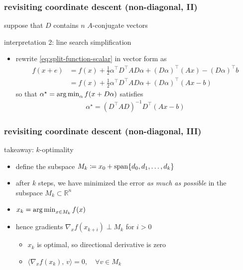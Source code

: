 \documentclass[10pt,dvipsnames*]{beamer}
\begin{document}
%
\begin{frame}
  \frametitle{revisiting coordinate descent (non-diagonal, II)}
  \pause
  \begin{assumption*}
    suppose that $D$ contains $n$ $A$-conjugate vectors
  \end{assumption*}
  \pause
  \begin{alertblock}{interpretation 2: line search simplification}
    \begin{itemize}
      \item rewrite \cref{eq:split-function-scalar} in vector form as
      \begin{align}
        \label{eq:split-function-vector}
        f(x + e) &= f(x) + \tfrac 12 \alpha^{\top} D^{\top} A D \alpha + (D\alpha)^{\top} (Ax) - (D\alpha)^{\top} b \\
        &= f(x) + \tfrac 12 \alpha^{\top} D^{\top} A D \alpha + (D\alpha)^{\top} (Ax - b)
      \end{align}
      so that $\alpha^{\star} = \operatorname*{arg\,min}_{\alpha} f(x + D\alpha)$ satisfies
      \begin{align}
        \label{eq:split-minimization-vector}
        \alpha^{\star} = (D^{\top} A D)^{-1} D^{\top} (Ax-b)
      \end{align}
    \end{itemize}
  \end{alertblock}
\end{frame}
%
\begin{frame}
  \frametitle{revisiting coordinate descent (non-diagonal, III)}
  \begin{block}{takeaway: $k$-optimality}
    \begin{itemize}
      \item define the subspace $M_k \coloneqq x_0 + \operatorname{span} \{ d_0, d_1, \ldots, d_{k} \}$
      \item after $k$ steps, we have minimized the error \emph{as much as possible} in the subspace $M_k \subset \mathbb{R}^n$
      \item $x_k = \operatorname*{arg\,min}_{x \in M_k} f(x)$
      \item hence gradients $\nabla_x f(x_{k+i}) \perp M_k$ for $i > 0$
      \begin{itemize}
        \item $x_k$ is optimal, so directional derivative is zero
        \item $\langle \nabla_x f(x_k),\, v \rangle = 0, \quad \forall v \in M_k$
      \end{itemize}
    \end{itemize}
  \end{block}
\end{frame}
%
\end{document}
